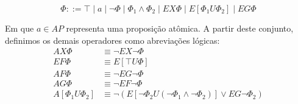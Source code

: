 \documentclass[cic,tc]{infufrgs}
\begin{document}
	\begin{equation}
		\Phi ::= \top \mid a \mid \neg \Phi \mid \Phi_1 \land \Phi_2 \mid EX \Phi \mid E[\Phi_1 U \Phi_2] \mid EG \Phi
	\end{equation}
	
	Em que $a \in AP$ representa uma proposição atômica. A partir deste conjunto, definimos os demais operadores como abreviações lógicas:
	\begin{equation}
		\begin{aligned}
			AX \Phi &\equiv \neg EX \neg \Phi \\
			EF \Phi &\equiv E[\top U \Phi] \\
			AF \Phi &\equiv \neg EG \neg \Phi \\
			AG \Phi &\equiv \neg EF \neg \Phi \\
			A[\Phi_1 U \Phi_2] &\equiv \neg (E[\neg \Phi_2 U (\neg \Phi_1 \land \neg \Phi_2)] \lor EG \neg \Phi_2)
		\end{aligned}
		\label{eq:equiv}
	\end{equation}
	
\end{document}
